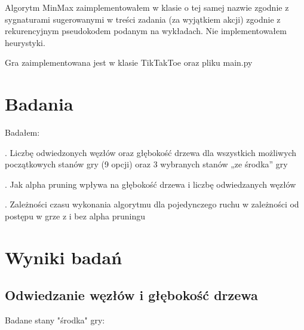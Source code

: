 \documentclass{article}
\begin{document}
Algorytm MinMax zaimplementowałem w klasie o tej samej nazwie zgodnie z sygnaturami sugerowanymi w treści zadania
(za wyjątkiem akcji) zgodnie z rekurencyjnym pseudokodem podanym na wykładach. Nie implementowałem heurystyki.

Gra zaimplementowana jest w klasie TikTakToe oraz pliku main.py

\pagebreak

\section{Badania}

Badałem:

. Liczbę odwiedzonych węzłów oraz głębokość drzewa dla wszystkich możliwych początkowych stanów gry (9 opcji) oraz 3 wybranych stanów „ze środka” gry

. Jak alpha pruning wpływa na głębokość drzewa i liczbę odwiedzanych węzłów

. Zależności czasu wykonania algorytmu dla pojedynczego ruchu w zależności od postępu w grze z i bez alpha pruningu

\section{Wyniki badań}

\subsection{Odwiedzanie węzłów i głębokość drzewa}

Badane stany "środka" gry:\\
\end{document}

